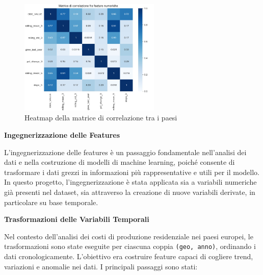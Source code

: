 \documentclass[conference]{IEEEtran}
\begin{document}
\begin{figure}[H]
\centering
\includegraphics[width=0.6\textwidth]{matrix.png} %
\caption{Heatmap della matrice di correlazione tra i paesi}
\label{fig:correlation-heatmap}
\end{figure}


\vspace{1em} \noindent\textbf{Ingegnerizzazione delle Features}

L’ingegnerizzazione delle features è un passaggio fondamentale nell’analisi dei dati e nella costruzione di modelli di machine learning, poiché consente di trasformare i dati grezzi in informazioni più rappresentative e utili per il modello. In questo progetto, l’ingegnerizzazione è stata applicata sia a variabili numeriche già presenti nel dataset, sia attraverso la creazione di nuove variabili derivate, in particolare su base temporale.

\noindent\textbf{Trasformazioni delle Variabili Temporali}

Nel contesto dell’analisi dei costi di produzione residenziale nei paesi europei, le trasformazioni sono state eseguite per ciascuna coppia \texttt{(geo, anno)}, ordinando i dati cronologicamente. L’obiettivo era costruire feature capaci di cogliere trend, variazioni e anomalie nei dati. I principali passaggi sono stati:
\end{document}
